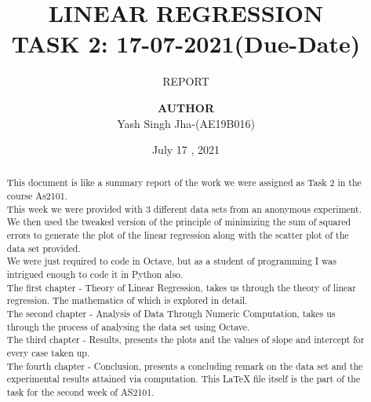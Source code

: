 \documentclass[a4paper, 12pt]{report}
\institute{Department Of Aerospace Engineering}
\title{LINEAR REGRESSION\\TASK 2: 17-07-2021(Due-Date) }
\subtitle{REPORT}
\author{\textbf{AUTHOR}\\Yash Singh Jha-(AE19B016)\\ }
\date{July 17 , 2021}
\begin{document}
    \maketitle
    \romantableofcontents
    \begin{abstract}
    This document is like a summary report of the work we were assigned as Task 2 in the course As2101.\\
    This week we were provided with 3 different data sets from an anonymous experiment. We then used the tweaked version of the principle of minimizing the sum of squared errors to generate the plot of the linear regression along with the scatter plot of the data set provided.\\ 
    We were just required to code in  Octave, but as a student of programming I was intrigued enough to code it in Python also.\\
    The first chapter - Theory of Linear Regression, takes us through the theory of linear regression.  The mathematics of which is explored in detail.\\
    The second chapter - Analysis of Data Through Numeric Computation, takes us through the process of analysing the  data set using Octave. \\ 
    The third chapter - Results, presents the plots and the values of slope and intercept for every case taken up.\\
    The fourth chapter - Conclusion, presents a concluding remark on the data set and the experimental results attained via computation.
    This LaTeX file itself is the part of the task for the second week of AS2101.
    
    \end{abstract}
\end{document}
